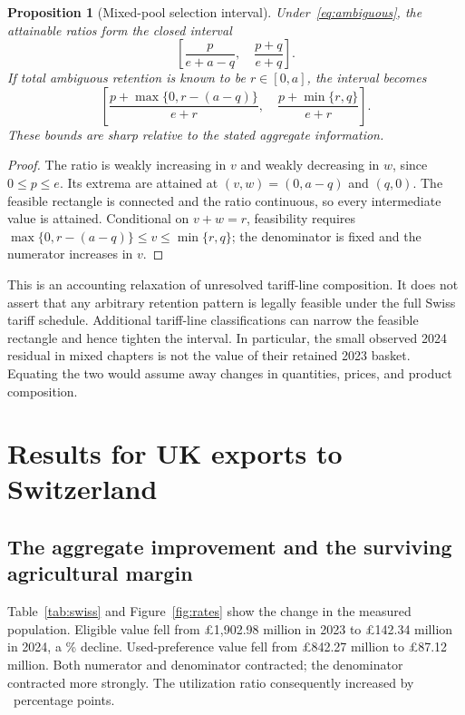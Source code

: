 \documentclass[11pt,a4paper]{article}
\newtheorem{proposition}{Proposition}
\begin{document}
\begin{proposition}[Mixed-pool selection interval]
Under~\eqref{eq:ambiguous}, the attainable ratios form the closed interval
\begin{equation}
 \left[\frac{p}{e+a-q},\quad\frac{p+q}{e+q}\right].
 \label{eq:bounds}
\end{equation}
If total ambiguous retention is known to be $r\in[0,a]$, the interval becomes
\begin{equation}
 \left[\frac{p+\max\{0,r-(a-q)\}}{e+r},\quad
       \frac{p+\min\{r,q\}}{e+r}\right].
 \label{eq:fixed}
\end{equation}
These bounds are sharp relative to the stated aggregate information.
\end{proposition}
\begin{proof}
The ratio is weakly increasing in $v$ and weakly decreasing in $w$, since $0\leq p\leq e$. Its extrema are attained at $(v,w)=(0,a-q)$ and $(q,0)$. The feasible rectangle is connected and the ratio continuous, so every intermediate value is attained. Conditional on $v+w=r$, feasibility requires $\max\{0,r-(a-q)\}\leq v\leq\min\{r,q\}$; the denominator is fixed and the numerator increases in $v$.
\end{proof}

This is an accounting relaxation of unresolved tariff-line composition. It does not assert that any arbitrary retention pattern is legally feasible under the full Swiss tariff schedule. Additional tariff-line classifications can narrow the feasible rectangle and hence tighten the interval. In particular, the small observed 2024 residual in mixed chapters is not the value of their retained 2023 basket. Equating the two would assume away changes in quantities, prices, and product composition.

\section{Results for UK exports to Switzerland}
\subsection{The aggregate improvement and the surviving agricultural margin}
Table~\ref{tab:swiss} and Figure~\ref{fig:rates} show the change in the measured population. Eligible value fell from \pounds1,902.98 million in 2023 to \pounds142.34 million in 2024, a \EligibleFall\% decline. Used-preference value fell from \pounds842.27 million to \pounds87.12 million. Both numerator and denominator contracted; the denominator contracted more strongly. The utilization ratio consequently increased by \SwissChange\ percentage points.
\end{document}
